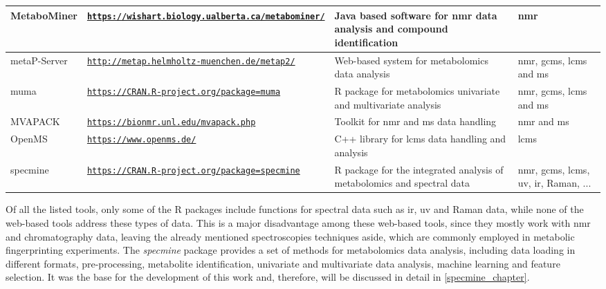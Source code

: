 \begin{table}[h]
\begin{scriptsize}
\begin{tabu}{|m{1.8cm}|m{5.2cm}|m{5cm}|m{2.4cm}|}
			\hline 
			MetaboMiner & \href{https://wishart.biology.ualberta.ca/metabominer/}{\nolinkurl{https://wishart.biology.ualberta.ca/metabominer/}} & Java based software for \gls{nmr} data analysis and compound identification & \gls{nmr} \\ 
			
			\hline 
			metaP-Server & \href{http://metap.helmholtz-muenchen.de/metap2/}{\nolinkurl{http://metap.helmholtz-muenchen.de/metap2/}} & Web-based system for metabolomics data analysis & \gls{nmr}, \gls{gcms}, \gls{lcms} and \gls{ms} \\ 
			
			\hline 
			muma & \href{https://CRAN.R-project.org/package=muma}{\nolinkurl{https://CRAN.R-project.org/package=muma}} & R package for metabolomics univariate and multivariate analysis & \gls{nmr}, \gls{gcms}, \gls{lcms} and \gls{ms} \\ 
			
			\hline 
			MVAPACK & \href{https://bionmr.unl.edu/mvapack.php}{\nolinkurl{https://bionmr.unl.edu/mvapack.php}} & Toolkit for \gls{nmr} and \gls{ms} data handling & \gls{nmr} and \gls{ms} \\ 
			
			\hline 
			OpenMS & \href{https://www.openms.de/}{\nolinkurl{https://www.openms.de/}} & C++ library for \gls{lcms} data handling and analysis & \gls{lcms} \\ 
			
			\hline 
			specmine & \href{https://CRAN.R-project.org/package=specmine}{\nolinkurl{https://CRAN.R-project.org/package=specmine}} & R package for the integrated analysis of metabolomics and spectral data & \gls{nmr}, \gls{gcms}, \gls{lcms}, \gls{uv}, \gls{ir}, Raman, ... \\ 
			
			\hline 		
		\end{tabu}
	\end{scriptsize}
\end{table}

Of all the listed tools, only some of the R packages include functions for spectral data such as \gls{ir}, \gls{uv} and Raman data, while none of the web-based tools address these types of data. This is a major disadvantage among these web-based tools, since they mostly work with \gls{nmr} and chromatography data, leaving the already mentioned spectroscopies techniques aside, which are commonly employed in metabolic fingerprinting experiments. The \textit{specmine} package provides a set of methods for metabolomics data analysis, including data loading in different formats, pre-processing, metabolite identification, univariate and multivariate data analysis, machine learning and feature selection. It was the base for the development of this work and, therefore, will be discussed in detail in \autoref{specmine_chapter}.



